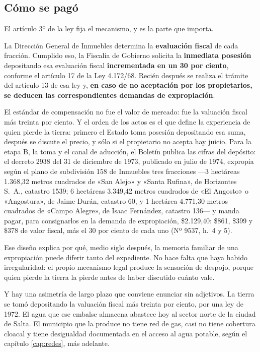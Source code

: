 \subsection*{Cómo se pagó}

El artículo 3º de la ley fija el mecanismo, y es la parte que importa.

La Dirección General de Inmuebles determina la \textbf{evaluación fiscal} de cada fracción. Cumplido eso, la Fiscalía de Gobierno solicita la \textbf{inmediata posesión} depositando esa evaluación fiscal \textbf{incrementada en un 30 por ciento}, conforme el artículo 17 de la Ley 4.172/68. Recién después se realiza el trámite del artículo 13 de esa ley y, \textbf{en caso de no aceptación por los propietarios, se deducen las correspondientes demandas de expropiación}.

El estándar de compensación no fue el valor de mercado: fue la valuación fiscal más treinta por ciento. Y el orden de los actos es el que define la experiencia de quien pierde la tierra: primero el Estado toma posesión depositando esa suma, después se discute el precio, y sólo si el propietario no acepta hay juicio. Para la etapa B, la toma y el canal de aducción, el Boletín publica las cifras del depósito: el decreto 2938 del 31 de diciembre de 1973, publicado en julio de 1974, expropia según el plano de subdivisión 158 de Inmuebles tres fracciones ---3 hectáreas 1.368,32 metros cuadrados de «San Alejo» y «Santa Rufina», de Horizontes S.\ A., catastro 1539; 6 hectáreas 3.349,42 metros cuadrados de «El Angosto» o «Angostura», de Jaime Durán, catastro 60, y 1 hectárea 4.771,30 metros cuadrados de «Campo Alegre», de Isaac Fernández, catastro 136--- y manda pagar, para consignarlos en la demanda de expropiación, \$2.129,40: \$861, \$399 y \$378 de valor fiscal, más el 30 por ciento de cada uno (Nº 9537, h.\ 4 y 5).

Ese diseño explica por qué, medio siglo después, la memoria familiar de una expropiación puede diferir tanto del expediente. No hace falta que haya habido irregularidad: el propio mecanismo legal produce la sensación de despojo, porque quien pierde la tierra la pierde antes de haber discutido cuánto vale.

Y hay una asimetría de largo plazo que conviene enunciar sin adjetivos. La tierra se tomó depositando la valuación fiscal más treinta por ciento, por una ley de 1972. El agua que ese embalse almacena abastece hoy al sector norte de la ciudad de Salta. El municipio que la produce no tiene red de gas, casi no tiene cobertura cloacal y tiene desigualdad documentada en el acceso al agua potable, según el capítulo \ref{cap:redes}, más adelante.


